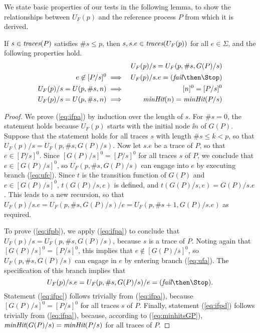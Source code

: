 
We state basic properties of our tests in the following lemma, to show the
relationships between $U_F(p)$ and the reference process $P$ from which it is
derived.

\begin{lemma}\label{lemma:ufproperties}
If $s\in\text{\it traces}(P)$ satisfies $\#s\le p$, then
$s, s.e\in\text{\it traces}(U_F(p))$ for all $e\in\Sigma$, and the following properties hold.
\begin{eqnarray}
\label{eq:ifpa}
  &  & U_F(p)/s = U_F(p,\#s,G(P)/s)
\\
\label{eq:ifpb}
e\not\in [P/s]^0 & \implies & U_F(p)/s.e = (\efail\then\Stop)
\\
\label{eq:ifpc}
U_F(p)/s = U(p,\# s,n)  & \implies & [n]^0 = [P/s]^0
\\
\label{eq:ifpd}
U_F(p)/s = U(p,\# s,n)  & \implies & \minhits(n) = \minhits(P/s)
\end{eqnarray}
\end{lemma}
\begin{proof}
We prove (\ref{eq:ifpa}) by induction over the length of $s$. For $\#s = 0$,
the statement holds because $U_F(p)$ starts with the initial node $\ii n$ of
$G(P)$. Suppose that the statement holds for all traces $s$ with length $\# s
\le k < p$, so that $U_F(p)/s = U_F(p,\#s,G(P)/s)$. Now let $s.e$ be a trace
of $P$, so that $e\in [P/s]^0$. Since $[G(P)/s]^0 = [P/s]^0$ for all traces
$s$ of $P$, we conclude that $e\in  [G(P)/s]^0$, so $U_F(p,\#s,G(P)/s)$ can
engage into $e$ by executing branch (\ref{eq:ufc}). Since $t$ is the
transition function of $G(P)$ and $e\in [G(P)/s]^0$, $t(G(P)/s,e)$ is
defined, and $t(G(P)/s,e) = G(P)/s.e$. This leads to a new recursion, so that
$U_F(p)/s.e = U_F(p,\#s,G(P)/s)/e = U_F(p,\#s+1,G(P)/s.e)$ as required.

To prove (\ref{eq:ifpb}), we apply (\ref{eq:ifpa}) to conclude that $U_F(p)/s
= U_F(p,\#s,G(P)/s)$, because $s$ is a trace of $P$. Noting again that
$[G(P)/s]^0 = [P/s]^0$, this implies that $e\not\in [G(P)/s]^0$, so
$U_F(p,\#s,G(P)/s)$ can engage in $e$ by entering branch (\ref{eq:ufa}). The
specification of this branch implies that
$$
U_F(p)/s.e = U_F(p,\#s,G(P)/s)/e = (\efail\then\Stop).
$$
%
Statement (\ref{eq:ifpc}) follows trivially from (\ref{eq:ifpa}), because
$[G(P)/s]^0 = [P/s]^0$ for all traces $s$ of $P$. Finally, statement
(\ref{eq:ifpd}) follows trivially from (\ref{eq:ifpa}), because, according to
(\ref{eq:minhitsGP}), $\text{\it minHit}(G(P)/s) = \text{\it minHit}(P/s)$ for all traces of
$P$. \xbox
\end{proof}
